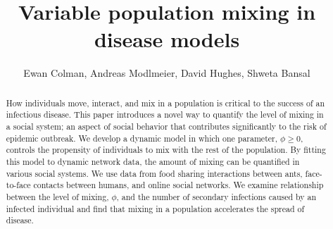 \documentclass[10pt]{article}
\title{Variable population mixing in disease models}
\author[1]{Ewan Colman, Andreas Modlmeier, David Hughes, Shweta Bansal}
\begin{document}
\maketitle
\vspace{-0.7cm}
\begin{abstract}
\noindent\normalsize
How individuals move, interact, and mix in a population is critical to the success of an infectious disease. This paper introduces a novel way to quantify the level of mixing in a social system; an aspect of social behavior that contributes significantly to the risk of epidemic outbreak. We develop a dynamic model in which one parameter, $\phi\geq 0$, controls the propensity of individuals to mix with the rest of the population. By fitting this model to dynamic network data, the amount of mixing can be quantified in various social systems. We use data from food sharing interactions between ants, face-to-face contacts between humans, and online social networks. We examine relationship between the level of mixing, $\phi$, and the number of secondary infections caused by an infected individual and find that mixing in a population accelerates the spread of disease. 
\end{abstract}
\vspace{0.5cm}
\end{document}
